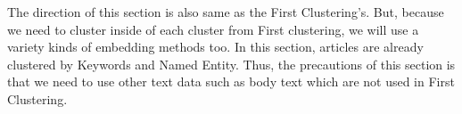 The direction of this section is also same as the First Clustering's. But, because we need to cluster inside of each cluster from First clustering, we will use a variety kinds of embedding methods too. In this section, articles are already clustered by Keywords and Named Entity. Thus, the precautions of this section is that we need to use other text data such as body text which are not used in First Clustering.
